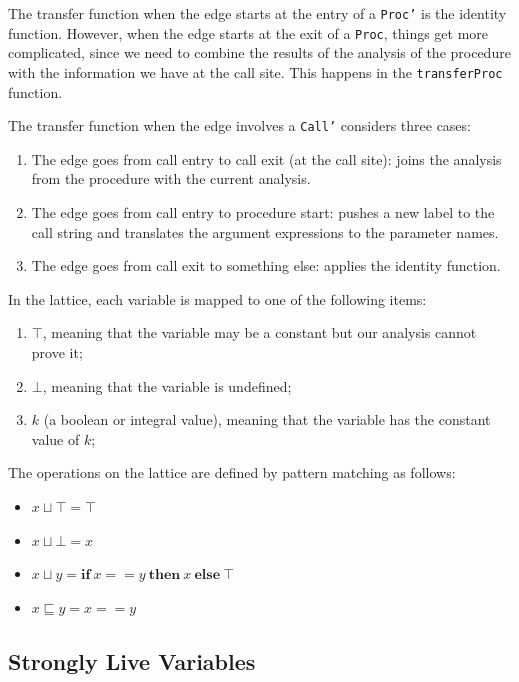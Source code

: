 \documentclass{article}
\begin{document}
The transfer function when the edge starts at the entry of a \texttt{Proc'} is the identity function. However, when the edge starts at the exit of a \texttt{Proc}, things get more complicated, since we need to combine the results of the analysis of the procedure with the information we have at the call site. This happens in the \texttt{transferProc} function.

The transfer function when the edge involves a \texttt{Call'} considers three cases:

\begin{enumerate}
	\item The edge goes from call entry to call exit (at the call site): joins the analysis from the procedure with the current analysis.
	\item The edge goes from call entry to procedure start: pushes a new label to the call string and translates the argument expressions to the parameter names.
	\item The edge goes from call exit to something else: applies the identity function.
\end{enumerate}

In the lattice, each variable is mapped to one of the following items:

\begin{enumerate}
	\item $\top$, meaning that the variable may be a constant but our analysis cannot prove it;
	\item $\bot$, meaning that the variable is undefined;
	\item $k$ (a boolean or integral value), meaning that the variable has the constant value of $k$;
\end{enumerate}

The operations on the lattice are defined by pattern matching as follows:

\begin{itemize}
	\item $x \sqcup \top = \top$
	\item $x \sqcup \bot = x$
	\item $x \sqcup y = \mathbf{if}\ x == y\ \mathbf{then}\ x\ \mathbf{else}\ \top$
	\item $x \sqsubseteq y = x == y$
\end{itemize}

\subsection*{Strongly Live Variables}
\end{document}
